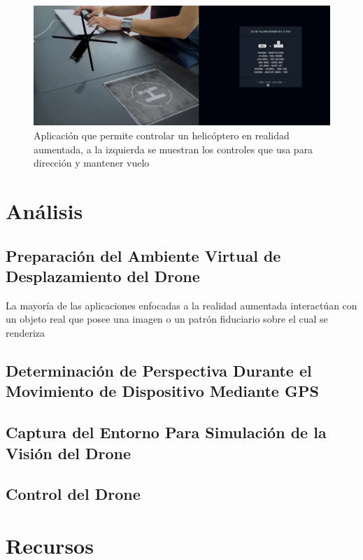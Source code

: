 \documentclass[a4paper]{article}
\begin{document}
\begin{figure}[h!]
  \centering
  \includegraphics[width=0.95\linewidth, keepaspectratio]{helicopteroAR}
  \caption{Aplicación que permite controlar un helicóptero en realidad aumentada, a la izquierda se muestran los controles que usa para dirección y mantener vuelo}
  \label{fig:Helicoptero AR}
\end{figure}

\section{Análisis}
\subsection{Preparación del Ambiente Virtual de Desplazamiento del Drone}
La mayoría de las aplicaciones enfocadas a la realidad aumentada interactúan con un objeto real que posee una imagen o un patrón fiduciario sobre el cual se renderiza 
\subsection{Determinación de Perspectiva Durante el Movimiento de Dispositivo Mediante GPS}
\subsection{Captura del Entorno Para Simulación de la Visión del Drone}
\subsection{Control del Drone}
\section{Recursos}




%

\end{document}
